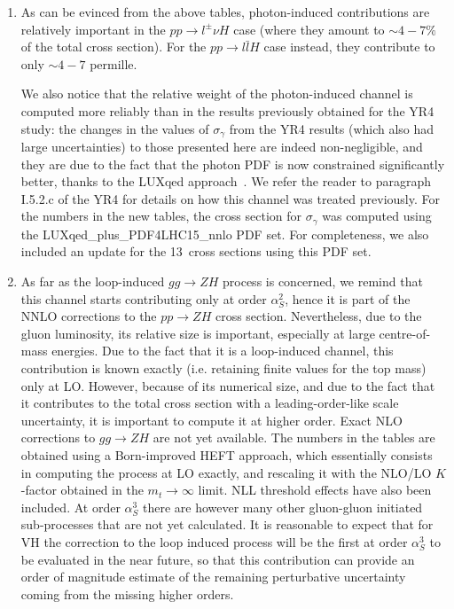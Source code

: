 \begin{enumerate}
\item As can be evinced from the above tables, photon-induced
  contributions are relatively important in the $p p \to l^\pm \nu H$
  case (where they amount to $\sim 4-7 \%$ of the total cross
  section). For the $pp\to l\bar l H$ case instead, they contribute to
  only $\sim 4-7$ permille.

  We also notice that the relative weight of the photon-induced
  channel is computed more reliably than in the results previously obtained
  for the YR4 study: the changes in the values of $\sigma_\gamma$ from
  the YR4 results (which also had large uncertainties) to those
  presented here are indeed non-negligible, and they are due to the
  fact that the photon PDF is now constrained significantly better, thanks to
  the LUXqed approach~\cite{Manohar:2016nzj,Manohar:2017eqh}. We refer
  the reader to paragraph I.5.2.c of the YR4 for details on how this
  channel was treated previously. For the numbers in the new tables,
  the cross section for $\sigma_\gamma$ was computed using the
  LUXqed\_plus\_PDF4LHC15\_nnlo PDF set. For completeness, we also
  included an update for the 13~\UTeV cross sections using this PDF set.
  
\item As far as the loop-induced $gg\rightarrow ZH$ process is
  concerned, we remind that this channel starts contributing only at
  order $\alpha_S^2$, hence it is part of the NNLO corrections to the
  $pp \rightarrow ZH$ cross section. Nevertheless, due to the gluon
  luminosity, its relative size is important, especially at large
  centre-of-mass energies.
Due to the fact that it is a loop-induced channel, this contribution
is known exactly (i.e. retaining finite values for the top mass) only at
LO.  However, because of its numerical size, and due to the fact that
it contributes to the total cross section with a leading-order-like
scale uncertainty, it is important to compute it at higher order.
Exact NLO corrections to $gg \rightarrow ZH$ are not yet available. The numbers in
the tables are obtained using a Born-improved HEFT approach, which
essentially consists in computing the process at LO exactly, and
rescaling it with the NLO/LO $K$-factor obtained in the
$m_t\to\infty$ limit. NLL threshold effects have also been
included. At order $\alpha_S^3$ there are however many other gluon-gluon initiated sub-processes
that are not yet calculated. It is reasonable
to expect that for VH the correction to the loop induced process will be the
first at order $\alpha_S^3$ to be evaluated in the near future, so that this contribution can provide an order of magnitude estimate of the remaining
perturbative uncertainty
coming from the missing higher orders.
\end{enumerate}

